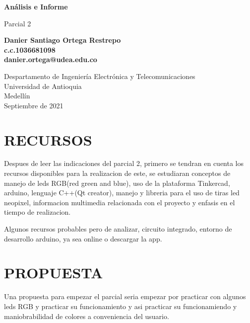 \documentclass{article}
\begin{document}
\begin{titlepage}
    \begin{center}
        \vspace*{1cm}
            
        \Huge
        \textbf{Análisis e Informe}
            
        \vspace{0.5cm}
        \LARGE
        Parcial 2
            
        \vspace{1.5cm}
            
        \textbf{Danier Santiago Ortega Restrepo}\\
        \textbf{c.c.1036681098}\\
        \textbf{danier.ortega@udea.edu.co}
            
        \vfill
            
        \vspace{0.8cm}
            
        \Large
        Despartamento de Ingeniería Electrónica y Telecomunicaciones\\
        Universidad de Antioquia\\
        Medellín\\
       Septiembre de 2021
            
    \end{center}
\end{titlepage}

\newpage
\tableofcontents
\section{RECURSOS}
Despues de leer las indicaciones del parcial 2, primero se tendran en cuenta los recursos disponibles para la realizacion de este, se estudiaran conceptos de manejo de leds RGB(red green and blue), uso de la plataforma Tinkercad, arduino, lenguaje C++(Qt creator), manejo y libreria para el uso de tiras led neopixel, informacion multimedia relacionada con el proyecto y enfasis en el tiempo de realizacion.

Algunos recursos probables pero de analizar, circuito integrado, entorno de desarrollo arduino, ya sea online o descargar la app.

\section{PROPUESTA}
Una propuesta para empezar el parcial seria empezar por practicar con algunos leds RGB y practicar su funcionamiento y asi practicar su funcionamiendo y maniobrabilidad de colores a conveniencia del usuario.
\end{document}
